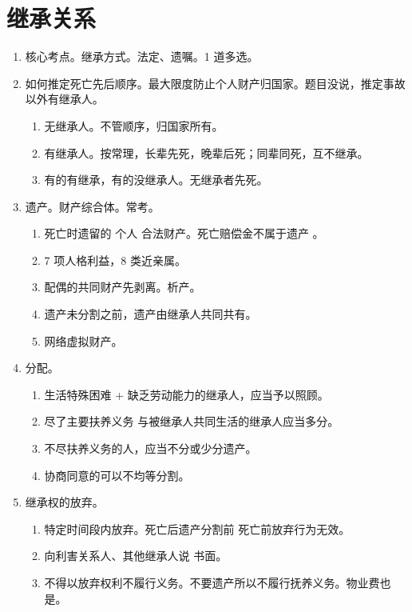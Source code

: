 \section{继承关系}
\begin{enumerate}
  \item 核心考点。继承方式。法定、遗嘱。1 道多选。
  \item 如何推定死亡先后顺序。最大限度防止个人财产归国家。题目没说，推定事故以外有继承人。
        \begin{enumerate}
          \item 无继承人。不管顺序，归国家所有。
          \item 有继承人。按常理，长辈先死，晚辈后死；同辈同死，互不继承。
          \item 有的有继承，有的没继承人。无继承者先死。
        \end{enumerate}
  \item 遗产。财产综合体。常考。
        \begin{enumerate}
          \item \yi 死亡时遗留的 \er 个人 \san 合法财产。死亡赔偿金不属于遗产 。
          \item 7 项人格利益，8 类近亲属。
          \item 配偶的共同财产先剥离。析产。
          \item 遗产未分割之前，遗产由继承人共同共有。
          \item 网络虚拟财产。
        \end{enumerate}
  \item 分配。
        \begin{enumerate}
          \item 生活特殊困难 + 缺乏劳动能力的继承人，应当予以照顾。
          \item 尽了主要扶养义务 \hz 与被继承人共同生活的继承人应当多分。
          \item 不尽扶养义务的人，应当不分或少分遗产。
          \item 协商同意的可以不均等分割。
        \end{enumerate}
  \item 继承权的放弃。
        \begin{enumerate}
          \item 特定时间段内放弃。死亡后遗产分割前 \yjt 死亡前放弃行为无效。
          \item 向利害关系人、其他继承人说 \hz 书面。
          \item 不得以放弃权利不履行义务。不要遗产所以不履行抚养义务。物业费也是。

\end{enumerate}
\end{enumerate}

